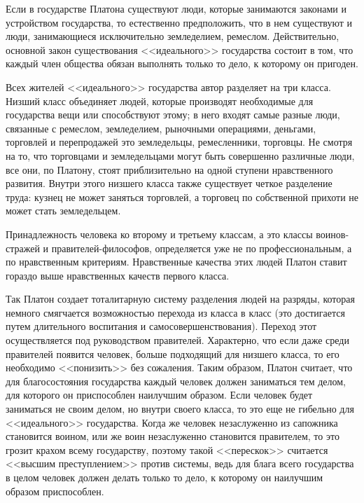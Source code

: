 	Если в государстве Платона существуют люди, которые занимаются законами и 
	устройством государства, то естественно предположить, что в нем существуют 
	и люди, занимающиеся исключительно земледелием, ремеслом. Действительно, 
	основной закон существования <<идеального>> государства состоит в том, что 
	каждый член общества обязан выполнять только то дело, к которому он 
	пригоден.

	Всех жителей <<идеального>> государства автор разделяет на три класса. 
	Низший класс объединяет людей, которые производят необходимые для 
	государства вещи или способствуют этому; в него входят самые разные люди, 
	связанные с ремеслом, земледелием, рыночными операциями, деньгами, 
	торговлей и перепродажей это земледельцы, ремесленники, торговцы. Не 
	смотря на то, что торговцами и земледельцами могут быть совершенно 
	различные люди, все они, по Платону, стоят приблизительно на одной ступени 
	нравственного развития. Внутри этого низшего класса также существует 
	четкое разделение труда: кузнец не может заняться торговлей, а торговец 
	по собственной прихоти не может стать земледельцем. 

	Принадлежность человека ко второму и третьему классам, а это классы 
	воинов-стражей и правителей-философов, определяется уже не по 
	профессиональным, а по нравственным критериям. Нравственные качества этих 
	людей Платон ставит гораздо выше нравственных качеств первого класса.

	Так Платон создает тоталитарную систему разделения людей на разряды, 
	которая немного смягчается возможностью перехода из класса в класс 
	(это достигается путем длительного воспитания и самосовершенствования). 
	Переход этот осуществляется под руководством правителей. Характерно, что 
	если даже среди правителей появится человек, больше подходящий для низшего 
	класса, то его необходимо <<понизить>> без сожаления. Таким образом, Платон 
	считает, что для благосостояния государства каждый человек должен 
	заниматься тем делом, для которого он приспособлен наилучшим образом. 
	Если человек будет заниматься не своим делом, но внутри своего класса, то 
	это еще не гибельно для <<идеального>> государства. Когда же человек 
	незаслуженно из сапожника становится воином, или же воин незаслуженно 
	становится правителем, то это грозит крахом всему государству, 
	поэтому такой <<перескок>> считается <<высшим преступлением>> против 
	системы, ведь для блага всего государства в целом человек должен делать 
	только то дело, к которому он наилучшим образом приспособлен. 

